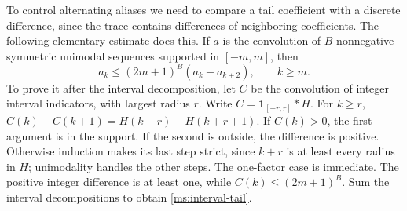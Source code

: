 To control alternating aliases we need to compare a tail coefficient
with a discrete difference, since the trace contains differences of
neighboring coefficients. The following elementary estimate does this.
If $a$ is
the convolution of $B$ nonnegative symmetric unimodal sequences
supported in $[-m,m]$, then
\begin{equation}\label{ms:interval-tail}
 a_k\le(2m+1)^B(a_k-a_{k+2}),\qquad k\ge m.
\end{equation}
To prove it after the interval decomposition, let $C$ be the
convolution of integer interval indicators, with largest radius $r$.
Write $C=\mathbf1_{[-r,r]}*H$. For $k\ge r$,
$C(k)-C(k+1)=H(k-r)-H(k+r+1)$. If $C(k)>0$, the first
argument is in the support. If the second is outside, the difference
is positive. Otherwise induction makes its last step strict, since
$k+r$ is at least every radius in $H$; unimodality handles the other
steps. The one-factor case is immediate. The positive integer
difference is at least one, while $C(k)\le(2m+1)^B$. Sum the
interval decompositions to obtain \eqref{ms:interval-tail}.

